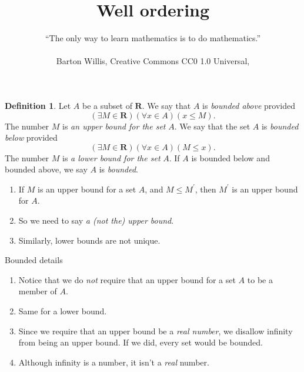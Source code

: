 \documentclass[fleqn]{beamer}
\title{\textbf{Well ordering}}
\subtitle{%
  ``The only way to learn mathematics is to do mathematics.''  \\   \vspace{0.15in}{Paul Halmos} \\
 \vspace{1.0in}
  \tiny Barton Willis, Creative Commons CC0 1.0 Universal, \the\year \normalsize
   }
\date{}
\newcommand{\reals}{\mathbf{R}}
\theoremstyle{definition}
\newtheorem{mydef}{Definition}
\newenvironment{numberlist}
   {\begin{enumerate}[(1)]
       \addtolength{\itemsep}{-0.5\itemsep}}
     {\end{enumerate}}
\begin{document}
\frame{\titlepage}


\begin{frame}

\begin{mydef} Let \(A\) be a subset of \(\reals\). We say that \(A\) is \emph{bounded above} provided
\[
   \left(\exists M \in \reals \right) \left( \forall x \in A \right)(x \leq M).
\]
The number \(M\) is \emph{an upper bound for  the set } \(A\).
We say that the set  \(A\) is \emph{bounded below} provided
\[
   \left(\exists M \in \reals \right) \left( \forall x \in A \right)(M \leq x).
\]
The number \(M\) is \emph{a lower bound for  the set } \(A\). If \(A\) is bounded below and bounded above, we say \(A\) is \emph{bounded}.
\end{mydef}

\begin{numberlist}
  \item If \(M\) is an upper bound for a set \(A\), and \(M \leq M^\prime\),
  then \(M^\prime\) is an upper bound for \(A\).

   \item So we need to say \emph{a (not the) upper bound}.

   \item Similarly, lower bounds are not unique.
\end{numberlist}
\end{frame}

\begin{frame}{Bounded details}

\begin{numberlist}

\item Notice that we do \emph{not} require that an upper bound for a set \(A\) to be 
a member of \(A\).

\vspace{0.15in}
\item Same for a lower bound.

\vspace{0.15in}

\item Since we require that an upper bound be a \emph{real number}, we disallow infinity from being an upper bound.  If we did, every set would be bounded.

\vspace{0.15in}
\item Although infinity is a number, it isn't a \emph{real} number.
\end{numberlist}

\end{frame}
\end{document}
